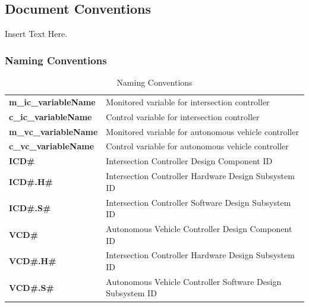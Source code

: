 \documentclass [10pt]{article}
\begin{document}
\subsection{Document Conventions}
Insert Text Here.

 
\subsubsection{Naming Conventions}


\begin{longtable}{ |p{ } p{ }|} \caption{Naming Conventions} \hline

\textbf{m\_ic\_variableName} & Monitored variable for intersection controller \\ 

\cellcolor{tableCell}\textbf{c\_ic\_variableName}  & \cellcolor{tableCell}Control variable for intersection controller \\ 

\textbf{m\_vc\_variableName} & Monitored variable for autonomous vehicle controller \\ 

\cellcolor{tableCell}\textbf{c\_vc\_variableName}  & \cellcolor{tableCell}Control variable for autonomous vehicle controller \\ 

\textbf{ICD\#} & Intersection Controller Design Component ID \\ 

\cellcolor{tableCell}\textbf{ICD\#.H\#}  & \cellcolor{tableCell}Intersection Controller Hardware Design Subsystem ID \\

\textbf{ICD\#.S\#} & Intersection Controller Software Design Subsystem ID \\ 

\cellcolor{tableCell}\textbf{VCD\#}  & \cellcolor{tableCell}Autonomous Vehicle Controller Design Component ID\\  

\textbf{VCD\#.H\#} & Intersection Controller Hardware Design Subsystem ID \\ 

\cellcolor{tableCell}\textbf{VCD\#.S\#}  & \cellcolor{tableCell}Autonomous Vehicle Controller Software Design Subsystem ID \\\hline



\end{longtable}
\end{document}
